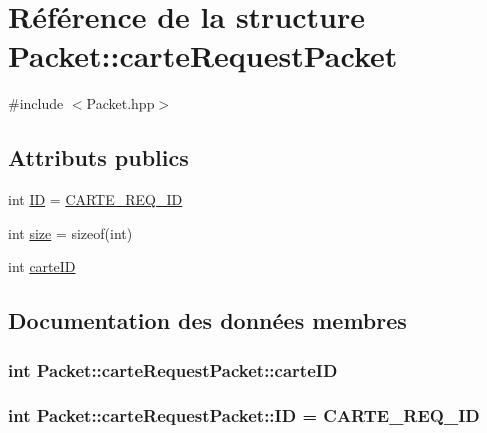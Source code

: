 \hypertarget{structPacket_1_1carteRequestPacket}{}\section{Référence de la structure Packet\+:\+:carte\+Request\+Packet}
\label{structPacket_1_1carteRequestPacket}


{\ttfamily \#include $<$Packet.\+hpp$>$}

\subsection*{Attributs publics}
\begin{DoxyCompactItemize}
\item 
int \hyperlink{structPacket_1_1carteRequestPacket_a02b110bcccb9143360e0fab7650dc142}{I\+D} = \hyperlink{classPacket_ae91c1d355e4c8f0bef5f893747473661a1afad4125bf1222a1b4f3201cb29ab3b}{C\+A\+R\+T\+E\+\_\+\+R\+E\+Q\+\_\+\+I\+D}
\item 
int \hyperlink{structPacket_1_1carteRequestPacket_a9ceed268bd66ee87f7f7ce9735f7cac5}{size} = sizeof(int)
\item 
int \hyperlink{structPacket_1_1carteRequestPacket_a22754892275a0a29e5ccde5fe26ecd14}{carte\+I\+D}
\end{DoxyCompactItemize}


\subsection{Documentation des données membres}
\hypertarget{structPacket_1_1carteRequestPacket_a22754892275a0a29e5ccde5fe26ecd14}{}
\subsubsection[{carte\+I\+D}]{\setlength{\rightskip}{0pt plus 5cm}int Packet\+::carte\+Request\+Packet\+::carte\+I\+D}\label{structPacket_1_1carteRequestPacket_a22754892275a0a29e5ccde5fe26ecd14}
\hypertarget{structPacket_1_1carteRequestPacket_a02b110bcccb9143360e0fab7650dc142}{}
\subsubsection[{I\+D}]{\setlength{\rightskip}{0pt plus 5cm}int Packet\+::carte\+Request\+Packet\+::\+I\+D = {\bf C\+A\+R\+T\+E\+\_\+\+R\+E\+Q\+\_\+\+I\+D}}\label{structPacket_1_1carteRequestPacket_a02b110bcccb9143360e0fab7650dc142}
\hypertarget{structPacket_1_1carteRequestPacket_a9ceed268bd66ee87f7f7ce9735f7cac5}{}
